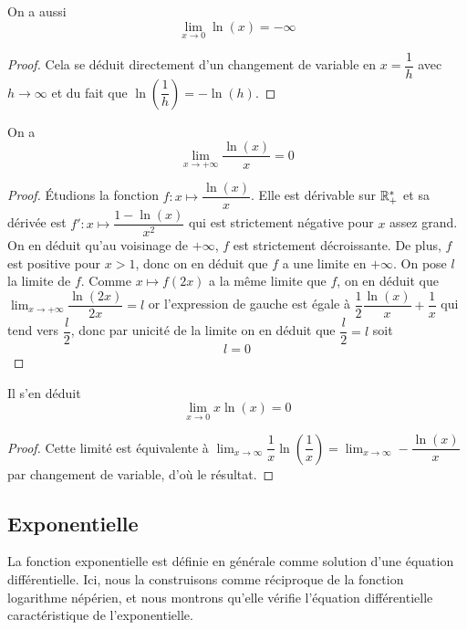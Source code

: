 \begin{cor}
    On a aussi $$\lim_{x\to 0}\ln(x) = -\infty$$
\end{cor}

\begin{proof}
    Cela se déduit directement d'un changement de variable en $x = \dfrac{1}{h}$ avec $h\to\infty$ et du fait que $\ln\left(\dfrac{1}{h}\right) = -\ln(h)$.
\end{proof}

\begin{prop}
    On a $$\lim_{x\to +\infty} \frac{\ln(x)}{x} = 0$$
\end{prop}

\begin{proof}
    \'Etudions la fonction $f : x\longmapsto \dfrac{\ln(x)}{x}$. Elle est dérivable sur $\mathbb{R}_+^*$ et sa dérivée est $f' : x\longmapsto \dfrac{1-\ln(x)}{x^2}$ qui est strictement négative pour $x$ assez grand. On en déduit qu'au voisinage de $+\infty$, $f$ est strictement décroissante. De plus, $f$ est positive pour $x > 1$, donc on en déduit que $f$ a une limite en $+\infty$. On pose $l$ la limite de $f$. Comme $x\mapsto f(2x)$ a la même limite que $f$, on en déduit que $\displaystyle\lim_{x\to+\infty} \dfrac{\ln(2x)}{2x} = l$ or l'expression de gauche est égale à $\dfrac{1}{2}\dfrac{\ln(x)}{x} + \dfrac{1}{x}$ qui tend vers $\dfrac{l}{2}$, donc par unicité de la limite on en déduit que $\dfrac{l}{2} = l$ soit $$\boxed{l=0}$$
\end{proof}

\begin{cor}
    Il s'en déduit $$\lim_{x\to0}x\ln(x) = 0$$
\end{cor}

\begin{proof}
    Cette limité est équivalente à $\displaystyle\lim_{x\to\infty}\dfrac{1}{x}\ln\left(\dfrac{1}{x}\right) = \displaystyle\lim_{x\to\infty}-\dfrac{\ln(x)}{x}$ par changement de variable, d'où le résultat.
\end{proof}

\subsection{Exponentielle}

La fonction exponentielle est définie en générale comme solution d'une équation différentielle. Ici, nous la construisons comme réciproque de la fonction logarithme népérien, et nous montrons qu'elle vérifie l'équation différentielle caractéristique de l'exponentielle.

